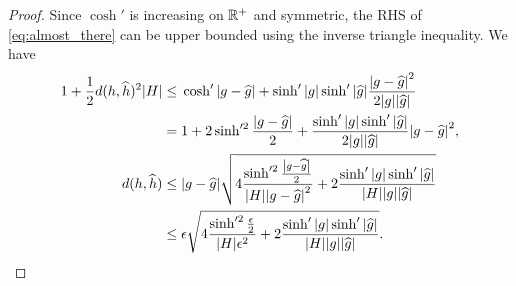 \documentclass[english, a4paper, 12pt]{article}
\begin{document}
\begin{proof}
	Since $\cosh'{}$ is increasing on $\mathbb{R}^+$ and symmetric, the RHS of \cref{eq:almost_there} can be upper bounded using the inverse triangle inequality.
	We have
	\begin{align}
	1 + \frac{1}{2} d(h, \widehat{h})^2 \abs{H} \leq{}&
		\cosh'{\abs{g - \widehat{g}}}
		+ \sinh'{\abs{g}} \sinh'{\abs{\widehat{g}}} \frac{\abs{g - \widehat{g}}^2}{2 \abs{g} \abs{\widehat{g}}}\\
	={}& 1 + 2 \sinh'^2{\frac{\abs{g - \widehat{g}}}{2}} + \frac{\sinh'{\abs{g}} \sinh'{\abs{\widehat{g}}}}{2 \abs{g} \abs{\widehat{g}}} \abs{g - \widehat{g}}^2,\\
	d(h, \widehat{h})
	\leq{}& \abs{g - \widehat{g}} \sqrt{
		4 \frac{\sinh'^2{\frac{\abs{g - \widehat{g}}}{2}}}{\abs{H} \abs{g - \widehat{g}}^2}
		+ 2 \frac{\sinh'{\abs{g}} \sinh'{\abs{\widehat{g}}}}{\abs{H} \abs{g} \abs{\widehat{g}}}
		}\\
	\leq{}& \epsilon \sqrt{
		4 \frac{\sinh'^2{\frac{\epsilon}{2}}}{\abs{H}\epsilon^2}
		+ 2 \frac{\sinh'{\abs{g}} \sinh'{\abs{\widehat{g}}}}{\abs{H} \abs{g} \abs{\widehat{g}}}
		}.
	\end{align}
\end{proof}
\end{document}

